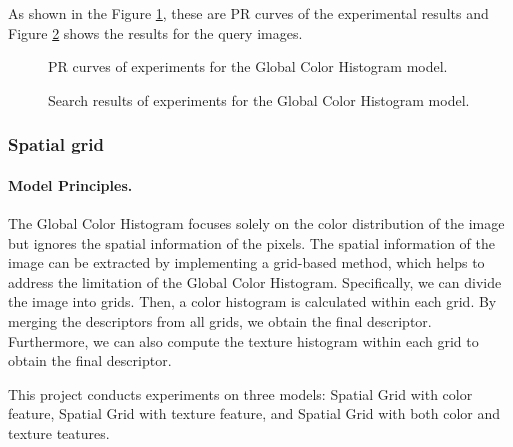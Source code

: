 \documentclass{article}
\begin{document}
As shown in the Figure \ref{fig:colorHistPR}, these are PR curves of the experimental results and Figure \ref{fig:colorHistResult} shows the results for the query images.

\begin{figure}[!tbp]
  \centering
  \hfill
  \hfill
  \caption{\label{fig:colorHistPR} PR curves of experiments for the Global Color Histogram model.}
\end{figure}

\begin{figure}[!tbp]
  \centering
  \hfill
  \hfill
  \caption{\label{fig:colorHistResult} Search results of experiments for the Global Color Histogram model.}
\end{figure}

\subsubsection{Spatial grid}

\paragraph{Model Principles.}
The Global Color Histogram focuses solely on the color distribution of the image but ignores the spatial information of the pixels. The spatial information of the image can be extracted by implementing a grid-based method, which helps to address the limitation of the Global Color Histogram. Specifically, we can divide the image into grids. Then, a color histogram is calculated within each grid. By merging the descriptors from all grids, we obtain the final descriptor. Furthermore, we can also compute the texture histogram within each grid to obtain the final descriptor.

This project conducts experiments on three models: Spatial Grid with color feature, Spatial Grid with texture feature, and Spatial Grid with both color and texture teatures.
\end{document}
